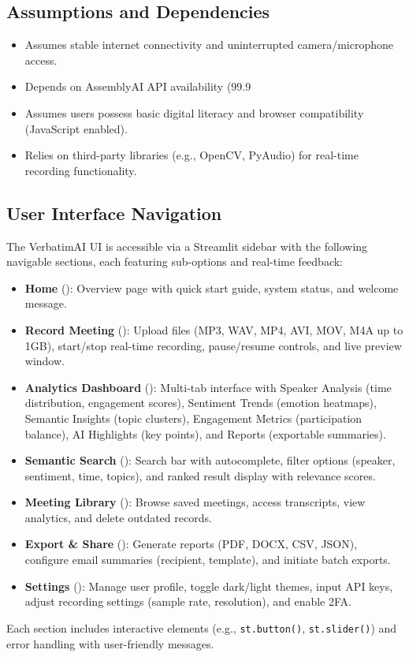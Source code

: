 \documentclass[12pt]{article}
\begin{document}
\subsection{Assumptions and Dependencies}
\begin{itemize}
    \item Assumes stable internet connectivity and uninterrupted camera/microphone access.
    \item Depends on AssemblyAI API availability (99.9%
    \item Assumes users possess basic digital literacy and browser compatibility (JavaScript enabled).
    \item Relies on third-party libraries (e.g., OpenCV, PyAudio) for real-time recording functionality.
\end{itemize}

\subsection{User Interface Navigation}
The VerbatimAI UI is accessible via a Streamlit sidebar with the following navigable sections, each featuring sub-options and real-time feedback:
\begin{itemize}
    \item \textbf{Home} (): Overview page with quick start guide, system status, and welcome message.
    \item \textbf{Record Meeting} (): Upload files (MP3, WAV, MP4, AVI, MOV, M4A up to 1GB), start/stop real-time recording, pause/resume controls, and live preview window.
    \item \textbf{Analytics Dashboard} (): Multi-tab interface with Speaker Analysis (time distribution, engagement scores), Sentiment Trends (emotion heatmaps), Semantic Insights (topic clusters), Engagement Metrics (participation balance), AI Highlights (key points), and Reports (exportable summaries).
    \item \textbf{Semantic Search} (): Search bar with autocomplete, filter options (speaker, sentiment, time, topics), and ranked result display with relevance scores.
    \item \textbf{Meeting Library} (): Browse saved meetings, access transcripts, view analytics, and delete outdated records.
    \item \textbf{Export \& Share} (): Generate reports (PDF, DOCX, CSV, JSON), configure email summaries (recipient, template), and initiate batch exports.
    \item \textbf{Settings} (): Manage user profile, toggle dark/light themes, input API keys, adjust recording settings (sample rate, resolution), and enable 2FA.
\end{itemize}
Each section includes interactive elements (e.g., \texttt{st.button()}, \texttt{st.slider()}) and error handling with user-friendly messages.
\end{document}
